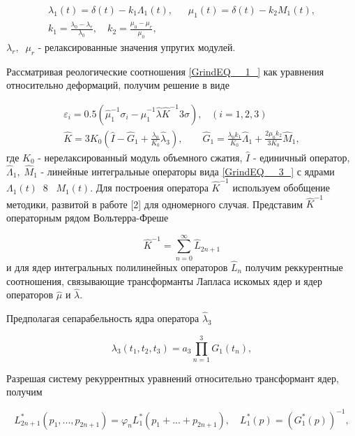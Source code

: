 \begin{equation} \label{GrindEQ__4_} \begin{array}{l} {\lambda _{1} (t)=\delta (t)-k_{1} \Lambda _{1} (t),\quad \; \; \mu _{1} (t)=\delta (t)-k_{2} M_{1} (t),} \\ {k_{1} =\frac{\lambda _{0} -\lambda _{r} }{\lambda _{0} } ,\quad k_{2} =\frac{\mu _{0} -\mu _{r} }{\mu _{0} } ,\quad } \end{array} \end{equation}
$\lambda _{r} ,\; \; \mu _{r} $ - релаксированные значения упругих модулей.

 Рассматривая реологические соотношения \eqref{GrindEQ__1_} как уравнения относительно деформаций, получим решение в виде

\begin{equation} \label{GrindEQ__5_} \begin{array}{l} {\varepsilon _{i} =0.5(\hat{\mu }_{1} ^{-1} \sigma _{i} -\hat{\mu }_{1} ^{-1} \hat{\lambda }\hat{K}^{-1} 3\sigma ),\; \; \; (i=1,2,3)} \\ {\hat{K}=3K_{0} \left(\hat{I}-\hat{G}_{1} +\frac{\lambda _{0} }{K_{0} } \hat{\lambda }_{3} \right),\quad \quad \hat{G}_{1} =\frac{\lambda _{0} k_{1} }{K_{0} } \hat{\Lambda }_{1} +\frac{2\mu _{0} k_{2} }{3K_{0} } \hat{M}_{1} ,} \end{array} \end{equation}
где $K_{0} $ - нерелаксированный модуль объемного сжатия, $\hat{I}$ - единичный оператор, $\hat{\Lambda }_{1} ,\; \hat{M}_{1} $ - линейные интегральные операторы вида \eqref{GrindEQ__3_} с ядрами $\Lambda _{1} (t)\; \; 8\; \; \; M_{1} (t)$.  Для построения оператора $\hat{K}^{-1} $ используем обобщение методики, развитой в работе [2] для одномерного случая. Представим $\hat{K}^{-1} $ операторным рядом Вольтерра-Фреше

\[\hat{K}^{-1} =\sum _{n=0}^{\infty }\hat{L}_{2n+1}  \]
и для ядер интегральных полилинейных операторов $\hat{L}_{n} $ получим реккурентные соотношения, связывающие трансформанты Лапласа искомых ядер и ядер операторов $\hat{\mu }$ и $\hat{\lambda }$.

 Предполагая сепарабельность ядра оператора $\hat{\lambda }_{3} $

\[\lambda _{3} (t_{1} ,t_{2} ,t_{3} )=a_{3} \prod _{n=1}^{3}G_{1}  (t_{n} ),\]

Разрешая систему рекуррентных уравнений относительно трансформант ядер, получим

\begin{equation} \label{GrindEQ__6_} L^{*} _{2n+1} (p_{1} ,...,p_{2n+1} )=\varphi _{n} L_{1}^{*} (p_{1} +...+p_{2n+1} ),\quad L_{1}^{*} (p)=\left(G_{1}^{*} (p)\right)^{-1} , \end{equation}

